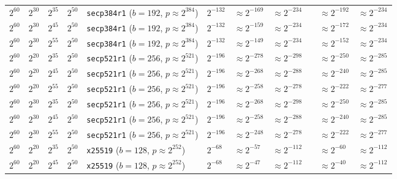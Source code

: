 \begin{table}[p]
\begin{tabular}{@{}lllllllllll@{}}
$2^{60}$	&$2^{30}$	&$2^{35}$	&$2^{50}$	&\texttt{secp384r1} ($b \!=\! 192$,\! $p \!\approx\! 2^{384}$)	&$2^{-132}$	&$\approx 2^{-169}$	& $\approx 2^{-234}$	&& $\approx 2^{-192}$	& $\approx 2^{-234}$	 \\
$2^{60}$	&$2^{30}$	&$2^{45}$	&$2^{50}$	&\texttt{secp384r1} ($b \!=\! 192$,\! $p \!\approx\! 2^{384}$)	&$2^{-132}$	&$\approx 2^{-159}$	& $\approx 2^{-234}$	&& $\approx 2^{-172}$	& $\approx 2^{-234}$	 \\
$2^{60}$	&$2^{30}$	&$2^{55}$	&$2^{50}$	&\texttt{secp384r1} ($b \!=\! 192$,\! $p \!\approx\! 2^{384}$)	&$2^{-132}$	&$\approx 2^{-149}$	& $\approx 2^{-234}$	&& $\approx 2^{-152}$	& $\approx 2^{-234}$	 \\
\midrule
$2^{60}$	&$2^{20}$	&$2^{35}$	&$2^{50}$	&\texttt{secp521r1} ($b \!=\! 256$,\! $p \!\approx\! 2^{521}$)	&$2^{-196}$	&$\approx 2^{-278}$	& $\approx 2^{-298}$	&& $\approx 2^{-250}$	& $\approx 2^{-285}$	 \\
$2^{60}$	&$2^{20}$	&$2^{45}$	&$2^{50}$	&\texttt{secp521r1} ($b \!=\! 256$,\! $p \!\approx\! 2^{521}$)	&$2^{-196}$	&$\approx 2^{-268}$	& $\approx 2^{-288}$	&& $\approx 2^{-240}$	& $\approx 2^{-285}$	 \\
$2^{60}$	&$2^{20}$	&$2^{55}$	&$2^{50}$	&\texttt{secp521r1} ($b \!=\! 256$,\! $p \!\approx\! 2^{521}$)	&$2^{-196}$	&$\approx 2^{-258}$	& $\approx 2^{-278}$	&& $\approx 2^{-222}$	& $\approx 2^{-277}$	 \\
$2^{60}$	&$2^{30}$	&$2^{35}$	&$2^{50}$	&\texttt{secp521r1} ($b \!=\! 256$,\! $p \!\approx\! 2^{521}$)	&$2^{-196}$	&$\approx 2^{-268}$	& $\approx 2^{-298}$	&& $\approx 2^{-250}$	& $\approx 2^{-285}$	 \\
$2^{60}$	&$2^{30}$	&$2^{45}$	&$2^{50}$	&\texttt{secp521r1} ($b \!=\! 256$,\! $p \!\approx\! 2^{521}$)	&$2^{-196}$	&$\approx 2^{-258}$	& $\approx 2^{-288}$	&& $\approx 2^{-240}$	& $\approx 2^{-285}$	 \\
$2^{60}$	&$2^{30}$	&$2^{55}$	&$2^{50}$	&\texttt{secp521r1} ($b \!=\! 256$,\! $p \!\approx\! 2^{521}$)	&$2^{-196}$	&$\approx 2^{-248}$	& $\approx 2^{-278}$	&& $\approx 2^{-222}$	& $\approx 2^{-277}$	 \\
\midrule
$2^{60}$	&$2^{20}$	&$2^{35}$	&$2^{50}$	&\texttt{x25519} ($b \!=\! 128$,\! $p \!\approx\! 2^{252}$)	&$2^{-68}$	&\cellcolor{red!25}$\approx 2^{-57}$	&$\approx 2^{-112}$	&& \cellcolor{red!25}$\approx 2^{-60}$	&$\approx 2^{-112}$	 \\
$2^{60}$	&$2^{20}$	&$2^{45}$	&$2^{50}$	&\texttt{x25519} ($b \!=\! 128$,\! $p \!\approx\! 2^{252}$)	&$2^{-68}$	&\cellcolor{red!25}$\approx 2^{-47}$	&$\approx 2^{-112}$	&& \cellcolor{red!25}$\approx 2^{-40}$	&$\approx 2^{-112}$	 \\

\end{tabular}
\end{table}
